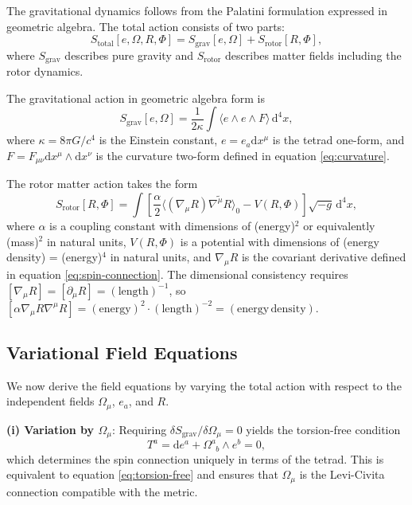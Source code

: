 \documentclass[11pt,a4paper]{article}
\numberwithin{equation}{section}
\theoremstyle{plain}
\theoremstyle{definition}
\theoremstyle{remark}
\newcommand{\dd}{\mathrm{d}}
\begin{document}
The gravitational dynamics follows from the Palatini formulation expressed in geometric algebra. The total action consists of two parts:
\begin{equation}
S_{\mathrm{total}}[e,\Omega,R,\Phi] = S_{\mathrm{grav}}[e,\Omega] + S_{\mathrm{rotor}}[R,\Phi],
\label{eq:action}
\end{equation}
where $S_{\mathrm{grav}}$ describes pure gravity and $S_{\mathrm{rotor}}$ describes matter fields including the rotor dynamics.

The gravitational action in geometric algebra form is
\begin{equation}
S_{\mathrm{grav}}[e,\Omega] = \frac{1}{2\kappa} \int \langle e \wedge e \wedge F \rangle \, \dd^4x,
\label{eq:palatini-action}
\end{equation}
where $\kappa = 8\pi G/c^4$ is the Einstein constant, $e = e_a \dd x^\mu$ is the tetrad one-form, and $F = F_{\mu\nu} \dd x^\mu \wedge \dd x^\nu$ is the curvature two-form defined in equation \eqref{eq:curvature}.

The rotor matter action takes the form
\begin{equation}
S_{\mathrm{rotor}}[R,\Phi] = \int \left[\frac{\alpha}{2}\langle (\nabla_\mu R)\widetilde{\nabla^\mu R} \rangle_0 - V(R,\Phi)\right] \sqrt{-g}\, \dd^4x,
\label{eq:rotor-action}
\end{equation}
where $\alpha$ is a coupling constant with dimensions of (energy)$^{2}$ or equivalently (mass)$^{2}$ in natural units, $V(R,\Phi)$ is a potential with dimensions of (energy density) = (energy)$^{4}$ in natural units, and $\nabla_\mu R$ is the covariant derivative defined in equation \eqref{eq:spin-connection}. The dimensional consistency requires $[\nabla_\mu R] = [\partial_\mu R] = \mathrm{(length)}^{-1}$, so $[\alpha \nabla_\mu R \nabla^\mu R] = \mathrm{(energy)^2 \cdot (length)^{-2}} = \mathrm{(energy\, density)}$.

\subsection{Variational Field Equations}

We now derive the field equations by varying the total action with respect to the independent fields $\Omega_\mu$, $e_a$, and $R$.

\textbf{(i) Variation by $\Omega_\mu$}: Requiring $\delta S_{\mathrm{grav}}/\delta \Omega_\mu = 0$ yields the torsion-free condition
\begin{equation}
T^a = \dd e^a + \Omega^a_{\phantom{a}b} \wedge e^b = 0,
\label{eq:field-torsion}
\end{equation}
which determines the spin connection uniquely in terms of the tetrad. This is equivalent to equation \eqref{eq:torsion-free} and ensures that $\Omega_\mu$ is the Levi-Civita connection compatible with the metric.
\end{document}
